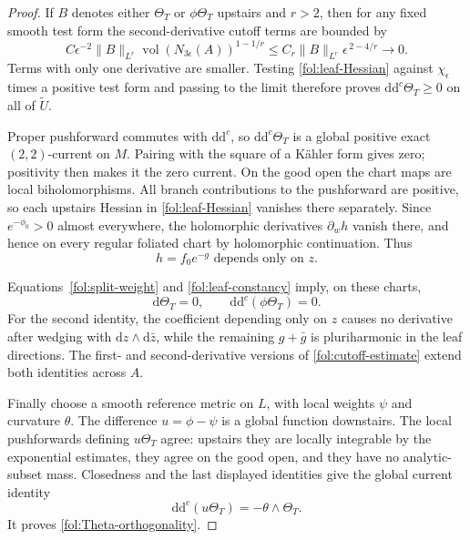 \documentclass[11pt,letterpaper]{article}
\newcommand{\dd}{\mathrm{d}}
\newcommand{\ddc}{\mathrm{d}\mathrm{d}^{c}}
\theoremstyle{definition}
\theoremstyle{remark}
\begin{document}
\begin{proof}
If $B$ denotes either $\Theta_T$ or $\phi\Theta_T$ upstairs and
$r>2$, then for any fixed smooth test form the second-derivative
cutoff terms are bounded by
\begin{equation}\label{fol:cutoff-estimate}
 C\epsilon^{-2}\|B\|_{L^r}
       \operatorname{vol}(N_{3\epsilon}(A))^{1-1/r}
 \leq C_r\|B\|_{L^r}\epsilon^{\,2-4/r}
 \longrightarrow0.
\end{equation}
Terms with only one derivative are smaller.  Testing
\eqref{fol:leaf-Hessian} against $\chi_\epsilon$ times a positive
test form and passing to the limit therefore proves
$\ddc\Theta_T\geq0$ on all of $\widetilde U$.

Proper pushforward commutes with $\ddc$, so $\ddc\Theta_T$ is a
global positive exact $(2,2)$-current on $M$.  Pairing with the square
of a K\"ahler form gives zero; positivity then makes it the zero
current.  On the good open the chart maps are local biholomorphisms.
All branch contributions to the pushforward are positive, so each
upstairs Hessian in \eqref{fol:leaf-Hessian} vanishes there separately.
Since $e^{-\phi_0}>0$ almost everywhere, the holomorphic derivatives
$\partial_w h$ vanish there, and hence on every regular foliated chart
by holomorphic continuation.  Thus
\begin{equation}\label{fol:leaf-constancy}
 h=f_0e^{-g}\text{ depends only on }z.
\end{equation}

Equations~\eqref{fol:split-weight} and \eqref{fol:leaf-constancy} imply,
on these charts,
\[
 \dd\Theta_T=0,\qquad \ddc(\phi\Theta_T)=0.
\]
For the second identity, the coefficient depending only on $z$ causes
no derivative after wedging with $\dd z\wedge\dd\bar z$, while the
remaining $g+\bar g$ is pluriharmonic in the leaf directions.
The first- and second-derivative versions of
\eqref{fol:cutoff-estimate} extend both identities across $A$.

Finally choose a smooth reference metric on $L$, with local weights
$\psi$ and curvature $\theta$.  The difference $u=\phi-\psi$ is a
global function downstairs.  The local pushforwards defining
$u\Theta_T$ agree: upstairs they are locally integrable by the
exponential estimates, they agree on the good open, and they have
no analytic-subset mass.  Closedness and the last displayed identities
give the global current identity
\begin{equation}\label{fol:potential-identity}
 \ddc(u\Theta_T)=-\theta\wedge\Theta_T.
\end{equation}
It proves \eqref{fol:Theta-orthogonality}.
\end{proof}
\end{document}
